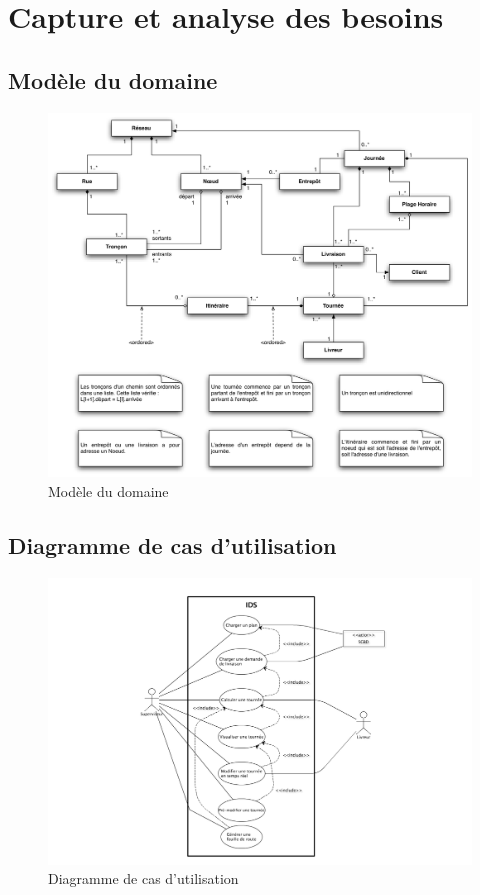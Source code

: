 \chapter{Capture et analyse des besoins}

\section{Mod\`ele du domaine}

\begin{figure}[h]
    \centering
    \includegraphics[width=140mm]{../diagrams/domain_model/domaine.png}
    \caption{Mod\`ele du domaine}
    \label{diagram:domaine}
\end{figure}

\pagebreak
\section{Diagramme de cas d’utilisation}

\begin{figure}[h]
    \centering
    \includegraphics[width=140mm]{../diagrams/use_case/use_case_diagram.png}
    \caption{Diagramme de cas d’utilisation}
    \label{diagram:use_case}
\end{figure}

